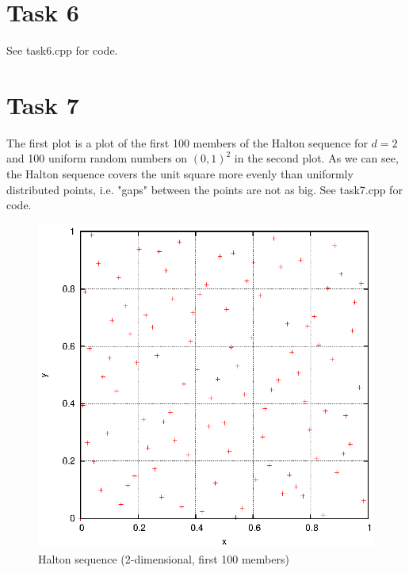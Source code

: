 \documentclass[]{article}
\begin{document}
\section*{Task 6}
See task6.cpp for code.
\clearpage

\section*{Task 7} The first plot is a plot of the
first 100 members of the Halton sequence for $d=2$ and 100 uniform random numbers on
$(0,1)^2$ in the second plot. As we can see, the Halton sequence covers the
unit square more evenly than uniformly distributed points, i.e. "gaps" between the points are not as
big. See task7.cpp for code. \\
\begin{figure}[!ht]
\centering
\includegraphics[width=.9\textwidth]{task7_halton.eps}
\caption{Halton sequence (2-dimensional, first 100 members)}
\label{fig:Task7a}
\end{figure}
\end{document}
